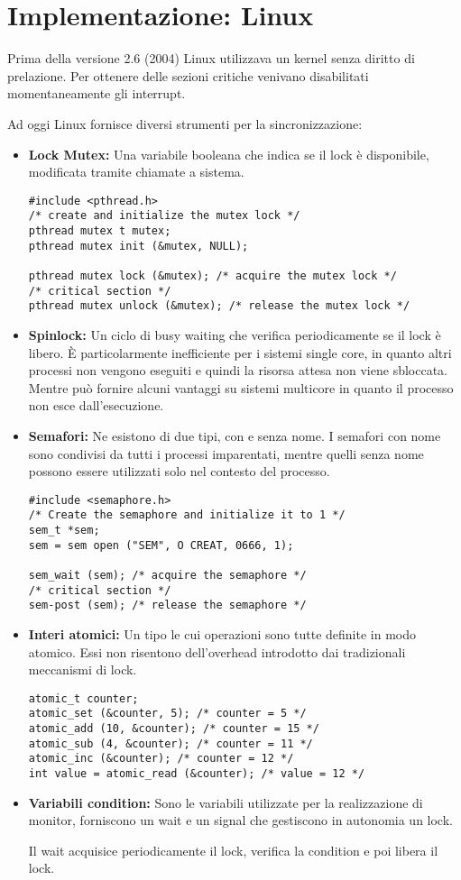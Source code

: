 \section{Implementazione: Linux}
Prima della versione 2.6 (2004) Linux utilizzava un kernel senza diritto di prelazione. Per ottenere delle sezioni critiche venivano disabilitati momentaneamente gli interrupt.

\spacer
Ad oggi Linux fornisce diversi strumenti per la sincronizzazione:
\begin{itemize}
    \item \textbf{Lock Mutex:} Una variabile booleana che indica se il lock è disponibile, modificata tramite chiamate a sistema.
          \begin{verbatim}
#include <pthread.h>
/* create and initialize the mutex lock */ 
pthread mutex t mutex;
pthread mutex init (&mutex, NULL);

pthread mutex lock (&mutex); /* acquire the mutex lock */ 
/* critical section */
pthread mutex unlock (&mutex); /* release the mutex lock */ 
    \end{verbatim}
    \item \textbf{Spinlock:} Un ciclo di busy waiting che verifica periodicamente se il lock è libero. È particolarmente inefficiente per i sistemi single core, in quanto altri processi non vengono eseguiti e quindi la risorsa attesa non viene sbloccata. Mentre può fornire alcuni vantaggi su sistemi multicore in quanto il processo non esce dall'esecuzione.
    \item \textbf{Semafori:} Ne esistono di due tipi, con e senza nome. I semafori con nome sono condivisi da tutti i processi imparentati, mentre quelli senza nome possono essere utilizzati solo nel contesto del processo.
          \begin{verbatim}
#include <semaphore.h>
/* Create the semaphore and initialize it to 1 */
sem_t *sem;
sem = sem open ("SEM", O CREAT, 0666, 1);

sem_wait (sem); /* acquire the semaphore */
/* critical section */
sem-post (sem); /* release the semaphore */ 
            \end{verbatim}
    \item \textbf{Interi atomici:} Un tipo le cui operazioni sono tutte definite in modo atomico. Essi non risentono dell'overhead introdotto dai tradizionali meccanismi di lock.
          \begin{verbatim}
atomic_t counter;
atomic_set (&counter, 5); /* counter = 5 */
atomic_add (10, &counter); /* counter = 15 */
atomic_sub (4, &counter); /* counter = 11 */
atomic_inc (&counter); /* counter = 12 */
int value = atomic_read (&counter); /* value = 12 */
    \end{verbatim}

    \item \textbf{Variabili condition:} Sono le variabili utilizzate per la realizzazione di monitor, forniscono un wait e un signal che gestiscono in autonomia un lock.

          Il wait acquisice periodicamente il lock, verifica la condition e poi libera il lock.

\end{itemize}

